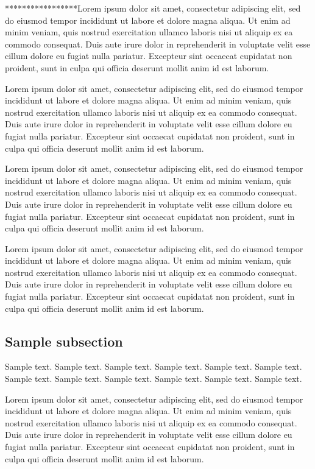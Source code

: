 \documentclass[jou,apacite]{apa6}
\begin{document}
*****************Lorem ipsum dolor sit amet, consectetur adipiscing elit, sed do eiusmod tempor incididunt ut labore et dolore magna aliqua. Ut enim ad minim veniam, quis nostrud exercitation ullamco laboris nisi ut aliquip ex ea commodo consequat. Duis aute irure dolor in reprehenderit in voluptate velit esse cillum dolore eu fugiat nulla pariatur. Excepteur sint occaecat cupidatat non proident, sunt in culpa qui officia deserunt mollit anim id est laborum.

Lorem ipsum dolor sit amet, consectetur adipiscing elit, sed do eiusmod tempor incididunt ut labore et dolore magna aliqua. Ut enim ad minim veniam, quis nostrud exercitation ullamco laboris nisi ut aliquip ex ea commodo consequat. Duis aute irure dolor in reprehenderit in voluptate velit esse cillum dolore eu fugiat nulla pariatur. Excepteur sint occaecat cupidatat non proident, sunt in culpa qui officia deserunt mollit anim id est laborum.

Lorem ipsum dolor sit amet, consectetur adipiscing elit, sed do eiusmod tempor incididunt ut labore et dolore magna aliqua. Ut enim ad minim veniam, quis nostrud exercitation ullamco laboris nisi ut aliquip ex ea commodo consequat. Duis aute irure dolor in reprehenderit in voluptate velit esse cillum dolore eu fugiat nulla pariatur. Excepteur sint occaecat cupidatat non proident, sunt in culpa qui officia deserunt mollit anim id est laborum.

Lorem ipsum dolor sit amet, consectetur adipiscing elit, sed do eiusmod tempor incididunt ut labore et dolore magna aliqua. Ut enim ad minim veniam, quis nostrud exercitation ullamco laboris nisi ut aliquip ex ea commodo consequat. Duis aute irure dolor in reprehenderit in voluptate velit esse cillum dolore eu fugiat nulla pariatur. Excepteur sint occaecat cupidatat non proident, sunt in culpa qui officia deserunt mollit anim id est laborum.

\subsection{Sample subsection}
Sample text. Sample text. Sample text. Sample text. Sample text. Sample text. 
Sample text. Sample text. Sample text. Sample text. Sample text. Sample text. 

Lorem ipsum dolor sit amet, consectetur adipiscing elit, sed do eiusmod tempor incididunt ut labore et dolore magna aliqua. Ut enim ad minim veniam, quis nostrud exercitation ullamco laboris nisi ut aliquip ex ea commodo consequat. Duis aute irure dolor in reprehenderit in voluptate velit esse cillum dolore eu fugiat nulla pariatur. Excepteur sint occaecat cupidatat non proident, sunt in culpa qui officia deserunt mollit anim id est laborum.
\end{document}
